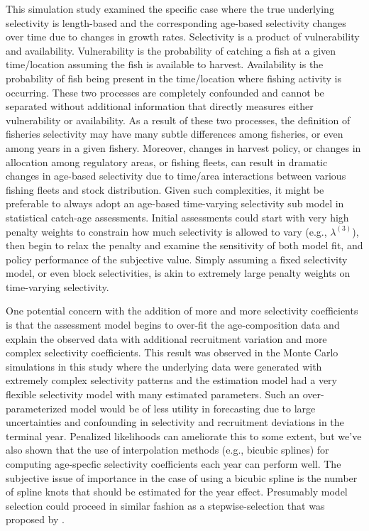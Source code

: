This simulation study examined the specific case where the true underlying selectivity is length-based and the corresponding age-based selectivity changes over time due to changes in growth rates.  Selectivity is a product of vulnerability and availability.  Vulnerability is the probability of catching a fish at a given time/location assuming the fish is available to harvest.  Availability is the probability of fish being present in the time/location where fishing activity is occurring.  These two processes are completely confounded and cannot be separated without additional information that directly measures either vulnerability or availability.  As a result of these two processes, the definition of fisheries selectivity may have many subtle differences among fisheries, or even among years in a given fishery.  Moreover, changes in harvest policy, or changes in allocation among regulatory areas, or fishing fleets, can result in dramatic changes in age-based selectivity due to time/area interactions between various fishing fleets and stock distribution.  Given such complexities, it might be preferable to always adopt an age-based time-varying selectivity sub model in statistical catch-age assessments. Initial assessments could start with very high penalty weights to constrain how much selectivity is allowed to vary (e.g., $\lambda^{(3)}$), then begin to relax the penalty and examine the sensitivity of both model fit, and policy performance of the subjective value.  Simply assuming a fixed selectivity model, or even block selectivities, is akin to extremely large penalty weights on time-varying selectivity.

One potential concern with the addition of more and more selectivity coefficients is that the assessment model begins to over-fit the age-composition data and explain the observed data with additional recruitment variation and more complex selectivity coefficients.  This result was observed in the Monte Carlo simulations in this study where the underlying data were generated with extremely complex selectivity patterns and the estimation model had a very flexible selectivity model with many estimated parameters.  Such an over-parameterized model would be of less utility in forecasting due to large uncertainties and confounding in selectivity and recruitment deviations in the terminal year.  Penalized likelihoods can ameliorate this to some extent, but we've also shown that the use of interpolation methods (e.g., bicubic splines) for computing age-specfic selectivity coefficients each year can perform well.  The subjective issue of importance in the case of using a bicubic spline is the number of spline knots that should be estimated for the year effect.  Presumably model selection could proceed in similar fashion as a stepwise-selection that was proposed by  \cite{thorson2012stepwise}.

